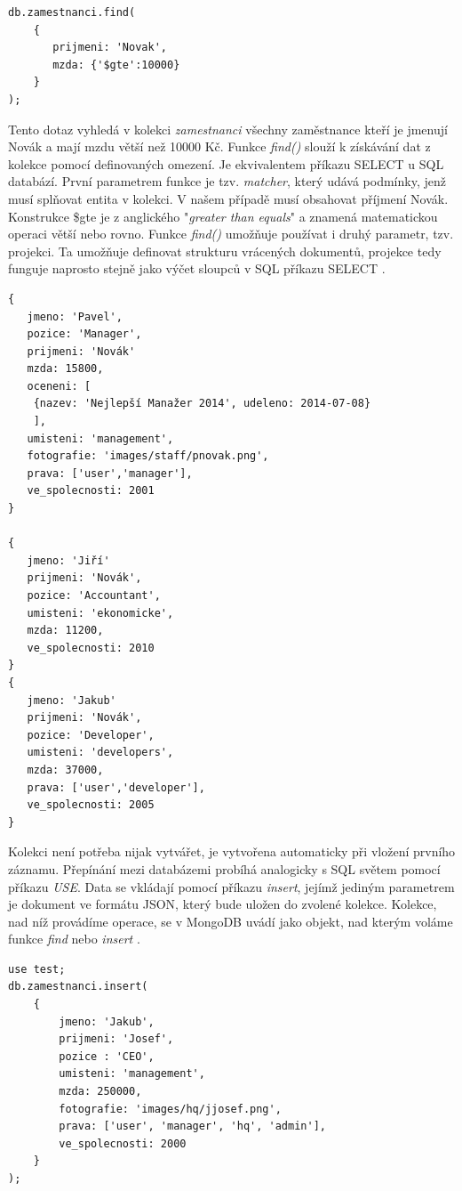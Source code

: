 \begin{lstlisting}[caption=Příklad databázového dotazu v MongoDB]
db.zamestnanci.find(
    {
       prijmeni: 'Novak',
       mzda: {'$gte':10000}
    }
);
\end{lstlisting}
\noindent Tento dotaz vyhledá v kolekci \emph{zamestnanci} všechny zaměstnance kteří je jmenují Novák a mají mzdu větší než 10000 Kč.
Funkce \emph{find()} slouží k získávání dat z kolekce pomocí definovaných omezení. Je ekvivalentem příkazu SELECT u SQL databází. První parametrem funkce je tzv. \emph{matcher}, který udává podmínky, jenž musí splňovat entita v kolekci. V našem případě musí obsahovat příjmení Novák. Konstrukce \$gte je z anglického "\emph{greater than equals}" a znamená matematickou operaci větší nebo rovno. Funkce \emph{find()} umožňuje používat i druhý parametr, tzv. projekci. Ta umožňuje definovat strukturu vrácených dokumentů, projekce tedy funguje naprosto stejně jako výčet sloupců v SQL příkazu SELECT \cite{mongoDocs}.
\pagebreak

\begin{lstlisting}[caption=Odpověď MongoDB databázového serveru]
{
   jmeno: 'Pavel',
   pozice: 'Manager',
   prijmeni: 'Novák'
   mzda: 15800,
   oceneni: [
   	{nazev: 'Nejlepší Manažer 2014', udeleno: 2014-07-08}
   	],
   umisteni: 'management',
   fotografie: 'images/staff/pnovak.png',
   prava: ['user','manager'],
   ve_spolecnosti: 2001
}

{
   jmeno: 'Jiří'
   prijmeni: 'Novák',
   pozice: 'Accountant',
   umisteni: 'ekonomicke',
   mzda: 11200,
   ve_spolecnosti: 2010
}
{
   jmeno: 'Jakub'
   prijmeni: 'Novák',
   pozice: 'Developer',
   umisteni: 'developers',
   mzda: 37000,
   prava: ['user','developer'],
   ve_spolecnosti: 2005
}
\end{lstlisting}

Kolekci není potřeba nijak vytvářet, je vytvořena automaticky při vložení prvního záznamu. Přepínání mezi databázemi probíhá analogicky s SQL světem pomocí příkazu \emph{USE}. Data se vkládají pomocí příkazu \emph{insert}, jejímž jediným parametrem je dokument ve formátu JSON, který bude uložen do zvolené kolekce. Kolekce, nad níž provádíme operace, se v MongoDB uvádí jako objekt, nad kterým voláme funkce \emph{find} nebo \emph{insert} \cite{mongoDocs}.

\pagebreak
\begin{lstlisting}[caption=Vložení dokumentu do databáze test a kolekce zamestnanci v MongoDB]
use test;
db.zamestnanci.insert(
	{
		jmeno: 'Jakub',
		prijmeni: 'Josef',
		pozice : 'CEO',
		umisteni: 'management',
		mzda: 250000,
		fotografie: 'images/hq/jjosef.png',
		prava: ['user', 'manager', 'hq', 'admin'],
		ve_spolecnosti: 2000 	
	}
);
\end{lstlisting}

